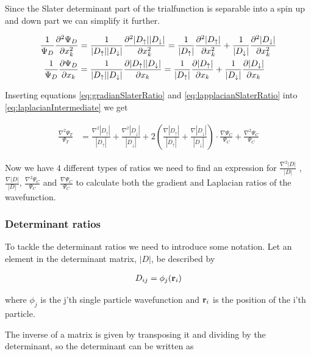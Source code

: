 \documentclass[11pt]{article}
\begin{document}
			Since the Slater determinant part of the trialfunction is separable into a spin up and down part we can simplify it further.

			\begin{align}
				\frac{1}{\Psi_D}\pdv[2]{\Psi_D}{x_k} &= \frac{1}{|D_\uparrow| |D_\downarrow|} \pdv[2]{ |D_\uparrow| |D_\downarrow| }{x_k}
				= \frac{1}{|D_\uparrow|} \pdv[2]{|D_\uparrow|}{x_k} + \frac{1}{|D_\downarrow|} \pdv[2]{|D_\downarrow|}{x_k} \label{eq:lapplacianSlaterRatio}
				\\
				\frac{1}{\Psi_D} \pdv{ \Psi_D }{x_k}  &=  \frac{1}{|D_\uparrow| |D_\downarrow|} \pdv{ |D_\uparrow| |D_\downarrow| }{x_k}
				= \frac{1}{|D_\uparrow|} \pdv{|D_\uparrow|}{x_k} + \frac{1}{|D_\downarrow|} \pdv{|D_\downarrow|}{x_k} \label{eq:gradianSlaterRatio}
			\end{align}

			Inserting equations \eqref{eq:gradianSlaterRatio} and \eqref{eq:lapplacianSlaterRatio} into \eqref{eq:laplacianIntermediate} we get

			\begin{align}
				\frac{\nabla^2 \Psi_T}{\Psi_T} &= \frac{\nabla^2 |D_\uparrow|}{|D_\uparrow|} + \frac{\nabla^2 |D_\downarrow|}{|D_\downarrow|} + 2 \left( \frac{\nabla |D_\uparrow|}{|D_\uparrow|} + \frac{\nabla |D_\downarrow|}{|D_\downarrow|} \right) \cdot \frac{\nabla\Psi_C}{\Psi_C} +  \frac{\nabla^2\Psi_C}{\Psi_C}
			\end{align}

			Now we have \(4\) different types of ratios we need to find an expression for \( \frac{\nabla^2 |D|}{|D|} \) , \(\frac{\nabla |D|}{|D|} \), \( \frac{\nabla^2\Psi_C}{\Psi_C} \) and \( \frac{\nabla\Psi_C}{\Psi_C} \) to calculate both the gradient and Laplacian ratios of the wavefunction.

			\subsubsection{Determinant ratios}
			To tackle the determinant ratios we need to introduce some notation. Let an element in the determinant matrix, \(|D|\),  be described by

			\begin{align}
				D_{ij} = \phi_j(\vb{r}_i)
			\end{align}

			where \(\phi_j\) is the j'th single particle wavefunction and \( \vb{r}_i \) is the position of the i'th particle.

			The inverse of a matrix is given by transposing it and dividing by the determinant, so the determinant can be written as
\end{document}
